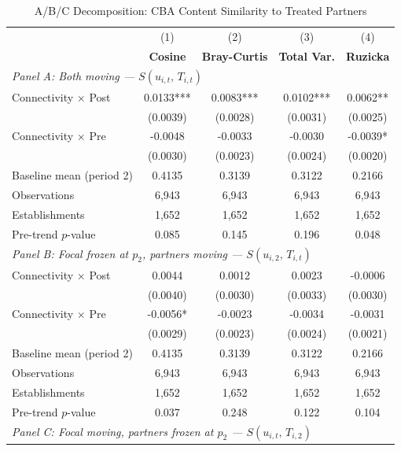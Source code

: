 \begin{table}[H]
\centering
\caption{A/B/C Decomposition: CBA Content Similarity to Treated Partners}
\label{tab:abc_decomposition_cba_similarity}
\scriptsize
\setlength{\tabcolsep}{8pt}
\begin{tabular}{lcccc}
\hline\hline
 & (1) & (2) & (3) & (4) \\
 & \textbf{Cosine} & \textbf{Bray-Curtis} & \textbf{Total Var.} & \textbf{Ruzicka} \\
\hline
\multicolumn{5}{l}{\textit{Panel A: Both moving  ---  $S(u_{i,t},\, T_{i,t})$}} \\
Connectivity $\times$ Post & 0.0133*** & 0.0083*** & 0.0102*** & 0.0062** \\
 & (0.0039) & (0.0028) & (0.0031) & (0.0025) \\
Connectivity $\times$ Pre & -0.0048 & -0.0033 & -0.0030 & -0.0039* \\
 & (0.0030) & (0.0023) & (0.0024) & (0.0020) \\
Baseline mean (period 2) & 0.4135 & 0.3139 & 0.3122 & 0.2166 \\
Observations &        6,943 &        6,943 &        6,943 &        6,943 \\
Establishments &        1,652 &        1,652 &        1,652 &        1,652 \\
Pre-trend $p$-value & 0.085 & 0.145 & 0.196 & 0.048 \\
\hline
\multicolumn{5}{l}{\textit{Panel B: Focal frozen at $p_2$, partners moving  ---  $S(u_{i,2},\, T_{i,t})$}} \\
Connectivity $\times$ Post & 0.0044 & 0.0012 & 0.0023 & -0.0006 \\
 & (0.0040) & (0.0030) & (0.0033) & (0.0030) \\
Connectivity $\times$ Pre & -0.0056* & -0.0023 & -0.0034 & -0.0031 \\
 & (0.0029) & (0.0023) & (0.0024) & (0.0021) \\
Baseline mean (period 2) & 0.4135 & 0.3139 & 0.3122 & 0.2166 \\
Observations &        6,943 &        6,943 &        6,943 &        6,943 \\
Establishments &        1,652 &        1,652 &        1,652 &        1,652 \\
Pre-trend $p$-value & 0.037 & 0.248 & 0.122 & 0.104 \\
\hline
\multicolumn{5}{l}{\textit{Panel C: Focal moving, partners frozen at $p_2$  ---  $S(u_{i,t},\, T_{i,2})$}} \\

\end{tabular}
\end{table}
